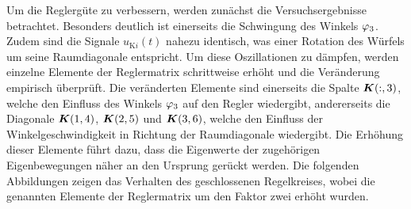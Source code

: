 Um die Reglergüte zu verbessern, werden zunächst die Versuchsergebnisse betrachtet. Besonders deutlich ist einerseits die Schwingung des Winkels $\varphi_{\text{3}}$. Zudem sind die Signale $u_{\text{K}i}(t)$ nahezu identisch, was einer Rotation des Würfels um seine Raumdiagonale entspricht. Um diese Oszillationen zu dämpfen, werden einzelne Elemente der Reglermatrix schrittweise erhöht und die Veränderung empirisch überprüft. Die veränderten Elemente sind einerseits die Spalte $\boldsymbol{K}(:,3)$, welche den Einfluss des Winkels $\varphi_{\text{3}}$ auf den Regler wiedergibt, andererseits die Diagonale $\boldsymbol{K}(1,4)$, $\boldsymbol{K}(2,5)$ und $\boldsymbol{K}(3,6)$, welche den Einfluss der Winkelgeschwindigkeit in Richtung der Raumdiagonale wiedergibt. Die Erhöhung dieser Elemente führt dazu, dass die Eigenwerte der zugehörigen Eigenbewegungen näher an den Ursprung gerückt werden. Die folgenden Abbildungen zeigen das Verhalten des geschlossenen Regelkreises, wobei die genannten Elemente der Reglermatrix um den Faktor zwei erhöht wurden.
